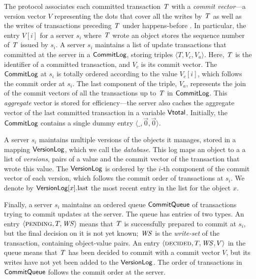 The protocol associates each committed transaction $\mathit{T}$ with a \emph{commit vector}---a version vector $V$ representing the dots that cover all the writes by $\mathit{T}$ as well as the writes of transactions preceding $\mathit{T}$ under happens-before . In particular, the entry $V[i]$ for a server $s_i$ where $\mathit{T}$ wrote an object stores the sequence number of $\mathit{T}$ issued by $s_i$. A server $s_i$ maintains a list of update transactions that committed at the server in a $\mathsf{CommitLog}$, storing triples $\langle T,V_c,V_a\rangle$. Here, $\mathit{T}$ is the identifier of a committed transaction, and $V_c$ is its commit vector. The $\mathsf{CommitLog}$ at $s_i$ is totally ordered according to the value $V_c[i]$, which follows the commit order at $s_i$. The last component of the triple, $V_a$, represents the join of the commit vectors of all the transactions up to $\mathit{T}$ in $\mathsf{CommitLog}$. This \emph{aggregate} vector is stored for efficiency---the server also caches the aggregate vector of the last committed transaction in a variable $\mathsf{Vtotal}$. Initially, the $\mathsf{CommitLog}$ contains a single dummy entry $\langle \_, \vec{0}, \vec{0} \rangle$.


A server $s_i$ maintains multiple versions of the objects it manages, stored in a mapping $\mathsf{VersionLog}$, which we call the \emph{database}. This log maps an object to a a list of \emph{versions}, pairs of a value and the commit vector of the transaction that wrote this value. The $\mathsf{VersionLog}$ is ordered by the $i$-th component of the commit vector of each version, which follows the commit order of transactions at $s_i$. We denote by $\mathsf{VersionLog}[x].{\rm last}$ the most recent entry in the list for the object $x$.

Finally, a server $s_i$ maintains an ordered queue $\mathsf{CommitQueue}$ of transactions trying to commit updates at the server. The queue has entries of two types. An entry $\langle \text{\sc pending}, T, \mathit{WS} \rangle$ means that $\mathit{T}$ is successfully prepared to commit at $s_i$, but the final decision on it is not yet known; $\mathit{WS}$ is the \emph{write-set} of the transaction, containing object-value pairs. An entry $\langle \text{\sc decided}, T, \mathit{WS}, V \rangle$ in the queue means that $\mathit{T}$ has been decided to commit with a commit vector $V$, but its writes have not yet been added to the $\mathsf{VersionLog}$. The order of transactions in $\mathsf{CommitQueue}$ follows the commit order at the server.

